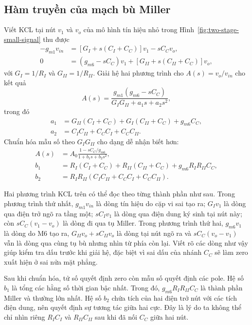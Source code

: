 \documentclass[11pt,a4paper]{report}
\begin{document}
\subsection{Hàm truyền của mạch bù Miller}
Viết KCL tại nút $v_1$ và $v_o$ của mô hình tín hiệu nhỏ trong
Hình~\ref{fig:two-stage-small-signal} thu được
\begin{align}
-g_{m1}v_{in}
&=\left[G_I+s(C_I+C_C)\right]v_1-sC_Cv_o,\\
0&=(g_{m6}-sC_C)v_1+\left[G_{II}+s(C_{II}+C_C)\right]v_o,
\end{align}
với $G_I=1/R_I$ và $G_{II}=1/R_{II}$. Giải hệ hai phương trình cho
$A(s)=v_o/v_{in}$ cho kết quả
\begin{equation}
A(s)=\frac{g_{m1}(g_{m6}-sC_C)}
{G_IG_{II}+a_1s+a_2s^2},
\end{equation}
trong đó
\begin{align}
a_1&=G_{II}(C_I+C_C)+G_I(C_{II}+C_C)+g_{m6}C_C,\\
a_2&=C_IC_{II}+C_CC_I+C_CC_{II}.
\end{align}
Chuẩn hóa mẫu số theo $G_IG_{II}$ cho dạng dễ nhận biết hơn:
\begin{align}
A(s)&=A_0\frac{1-sC_C/g_{m6}}{1+b_1s+b_2s^2},\\
b_1&=R_I(C_I+C_C)+R_{II}(C_{II}+C_C)
+g_{m6}R_IR_{II}C_C,\\
b_2&=R_IR_{II}(C_IC_{II}+C_CC_I+C_CC_{II}).
\end{align}

Hai phương trình KCL trên có thể đọc theo từng thành phần như sau. Trong phương
trình thứ nhất, $g_{m1}v_{in}$ là dòng tín hiệu do cặp vi sai tạo ra;
$G_Iv_1$ là dòng qua điện trở ngõ ra tầng một; $sC_Iv_1$ là dòng qua điện dung
ký sinh tại nút này; còn $sC_C(v_1-v_o)$ là dòng đi qua tụ Miller. Trong phương
trình thứ hai, $g_{m6}v_1$ là dòng do M6 tạo ra, $G_{II}v_o+sC_{II}v_o$ là dòng
tại nút ngõ ra và $sC_C(v_o-v_1)$ vẫn là dòng qua cùng tụ bù nhưng nhìn từ phía
còn lại. Viết rõ các dòng như vậy giúp kiểm tra dấu trước khi giải hệ, đặc biệt
vì sai dấu của nhánh $C_C$ sẽ làm zero xuất hiện ở sai nửa mặt phẳng.

Sau khi chuẩn hóa, tử số quyết định zero còn mẫu số quyết định các pole. Hệ số
$b_1$ là tổng các hằng số thời gian bậc nhất. Trong đó,
$g_{m6}R_IR_{II}C_C$ là thành phần Miller và thường lớn nhất. Hệ số $b_2$ chứa
tích của hai điện trở nút với các tích điện dung, nên quyết định sự tương tác
giữa hai cực. Đây là lý do ta không thể chỉ nhìn riêng $R_IC_I$ và
$R_{II}C_{II}$ sau khi đã nối $C_C$ giữa hai nút.
\end{document}
